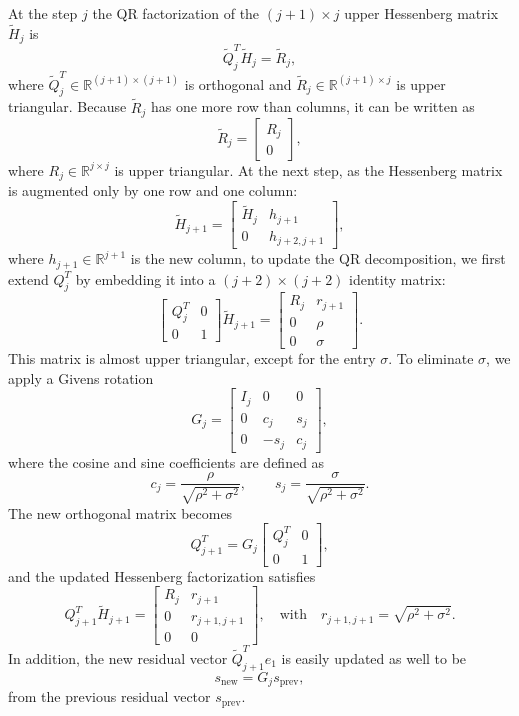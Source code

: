 \documentclass[hidelinks]{article}
\begin{document}
At the step $j$ the QR factorization of the \((j+1) \times j\) upper Hessenberg matrix \( \widetilde{H}_j \) is
\[
\widetilde{Q}^T_j \widetilde{H}_j = \widetilde{R}_j,
\]
where \( \widetilde{Q}^T_j \in \mathbb{R}^{(j+1) \times (j+1)} \) is orthogonal and \( \widetilde{R}_j \in \mathbb{R}^{(j+1) \times j} \) is upper triangular. Because \( \widetilde{R}_j \) has one more row than columns, it can be written as
\[
\widetilde{R}_j = 
\begin{bmatrix}
R_j \\
0
\end{bmatrix},
\]
where \( R_j \in \mathbb{R}^{j \times j} \) is upper triangular.
At the next step, as the Hessenberg matrix is augmented only by one row and one column:
\[
\widetilde{H}_{j+1} = 
\begin{bmatrix}
\widetilde{H}_j & h_{j+1} \\
0 & h_{j+2,j+1}
\end{bmatrix},
\]
where \( h_{j+1} \in \mathbb{R}^{j+1} \) is the new column, to update the QR decomposition, we first extend \( Q^T_j \) by embedding it into a \((j+2) \times (j+2)\) identity matrix:
\[
\begin{bmatrix}
Q^T_j & 0 \\
0 & 1
\end{bmatrix} \widetilde{H}_{j+1} =
\begin{bmatrix}
R_j & r_{j+1} \\
0 & \rho \\
0 & \sigma
\end{bmatrix}.
\]
This matrix is almost upper triangular, except for the entry \( \sigma \). To eliminate \( \sigma \), we apply a Givens rotation
\[
G_j = 
\begin{bmatrix}
I_j & 0 & 0 \\
0 & c_j & s_j \\
0 & -s_j & c_j
\end{bmatrix},
\]
where the cosine and sine coefficients are defined as
\[
c_j = \frac{\rho}{\sqrt{\rho^2 + \sigma^2}}, \qquad
s_j = \frac{\sigma}{\sqrt{\rho^2 + \sigma^2}}.
\]
The new orthogonal matrix becomes
\[
Q^T_{j+1} = G_j 
\begin{bmatrix}
Q^T_j & 0 \\
0 & 1
\end{bmatrix},
\]
and the updated Hessenberg factorization satisfies
\[
Q^T_{j+1} \widetilde{H}_{j+1} =
\begin{bmatrix}
R_j & r_{j+1} \\
0 & r_{j+1,j+1} \\
0 & 0
\end{bmatrix},
\quad \text{with} \quad
r_{j+1,j+1} = \sqrt{\rho^2 + \sigma^2}.
\]
In addition, the new residual vector $\widetilde{Q}^T_{j+1}e_1$ is easily updated as well to be
\[
s_\text{new} = G_j s_\text{prev},
\]
from the previous residual vector $s_\text{prev}$.
\end{document}
